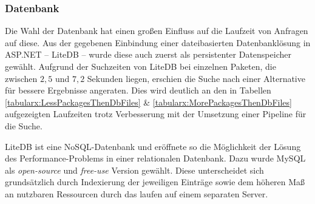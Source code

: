 \subsubsection{Datenbank} \label{sec:ExperimenteDB}
    Die Wahl der Datenbank hat einen großen Einfluss auf die Laufzeit von Anfragen auf diese.
    Aus der gegebenen Einbindung einer dateibasierten Datenbanklösung in ASP.NET -- LiteDB -- wurde diese auch zuerst als persistenter Datenspeicher gewählt.
    Aufgrund der Suchzeiten von LiteDB bei einzelnen Paketen, die zwischen $2,5$ und $7,2$ Sekunden liegen, erschien die Suche nach einer Alternative für bessere Ergebnisse angeraten.
    Dies wird deutlich an den in Tabellen \ref{tabularx:LessPackagesThenDbFiles} \& \ref{tabularx:MorePackagesThenDbFiles} aufgezeigten Laufzeiten trotz Verbesserung mit der Umsetzung einer Pipeline für die Suche.

    LiteDB ist eine NoSQL-Datenbank und eröffnete so die Möglichkeit der Lösung des Performance-Problems in einer relationalen Datenbank.
    Dazu wurde MySQL als \textit{open-source} und \textit{free-use} Version gewählt.
    Diese unterscheidet sich grundsätzlich durch Indexierung der jeweiligen Einträge sowie dem höheren Maß an nutzbaren Ressourcen durch das laufen auf einem separaten Server.
